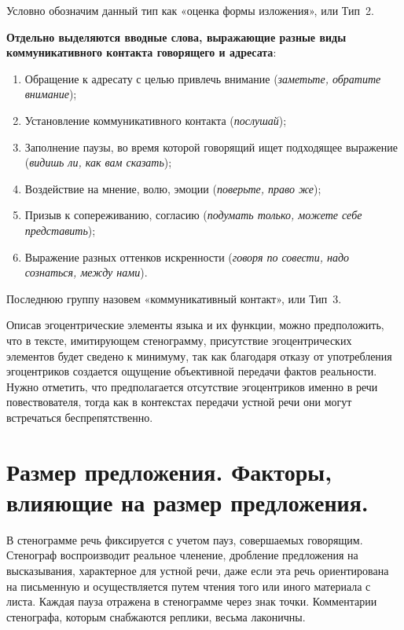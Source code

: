 \documentclass{kursa4}
\begin{document}
      Условно обозначим данный тип как «оценка формы изложения», или Тип~2. 

      \textbf{Отдельно выделяются вводные слова, выражающие разные виды
      коммуникативного контакта говорящего и адресата}:
      \begin{enumerate}
        \item Обращение к адресату с целью привлечь внимание (\textit{заметьте,
        обратите внимание});
        \item Установление коммуникативного контакта (\textit{послушай});
        \item Заполнение паузы, во время которой говорящий ищет подходящее
        выражение (\textit{видишь ли, как вам сказать});
        \item Воздействие на мнение, волю, эмоции (\textit{поверьте, право же});
        \item Призыв к сопереживанию, согласию (\textit{подумать только, можете
        себе представить});
        \item Выражение разных оттенков искренности (\textit{говоря по совести,
        надо сознаться, между нами}).
      \end{enumerate}
      Последнюю группу назовем «коммуникативный контакт», или Тип~3.

      Описав эгоцентрические элементы языка и их функции, можно
      предположить, что в тексте, имитирующем стенограмму, присутствие
      эгоцентрических элементов будет сведено к минимуму, так как благодаря
      отказу от употребления эгоцентриков создается ощущение объективной
      передачи фактов реальности. Нужно отметить, что предполагается
      отсутствие эгоцентриков именно в речи повествователя, тогда как в
      контекстах передачи устной речи они могут встречаться беспрепятственно.

    \section{Размер предложения. Факторы, влияющие на размер предложения.}

      В стенограмме речь фиксируется с учетом пауз, совершаемых говорящим.
      Стенограф воспроизводит реальное членение, дробление предложения на
      высказывания, характерное для устной речи, даже если эта речь
      ориентирована на письменную и осуществляется путем чтения того или
      иного материала с листа. Каждая пауза отражена в стенограмме через знак
      точки. Комментарии стенографа, которым снабжаются реплики, весьма
      лаконичны.
\end{document}
